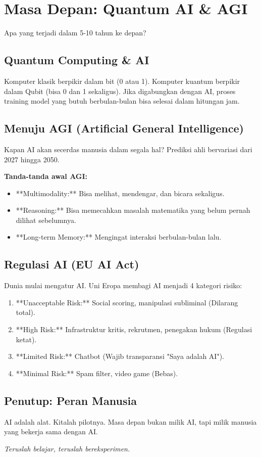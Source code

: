 \chapter{Masa Depan: Quantum AI \& AGI}
\label{chap:future}

Apa yang terjadi dalam 5-10 tahun ke depan?

\section{Quantum Computing \& AI}

Komputer klasik berpikir dalam bit (0 atau 1). Komputer kuantum berpikir dalam Qubit (bisa 0 dan 1 sekaligus).
Jika digabungkan dengan AI, proses training model yang butuh berbulan-bulan bisa selesai dalam hitungan jam.

\section{Menuju AGI (Artificial General Intelligence)}

Kapan AI akan secerdas manusia dalam segala hal?
Prediksi ahli bervariasi dari 2027 hingga 2050.

\textbf{Tanda-tanda awal AGI:}
\begin{itemize}
    \item **Multimodality:** Bisa melihat, mendengar, dan bicara sekaligus.
    \item **Reasoning:** Bisa memecahkan masalah matematika yang belum pernah dilihat sebelumnya.
    \item **Long-term Memory:** Mengingat interaksi berbulan-bulan lalu.
\end{itemize}

\section{Regulasi AI (EU AI Act)}

Dunia mulai mengatur AI. Uni Eropa membagi AI menjadi 4 kategori risiko:
\begin{enumerate}
    \item **Unacceptable Risk:** Social scoring, manipulasi subliminal (Dilarang total).
    \item **High Risk:** Infrastruktur kritis, rekrutmen, penegakan hukum (Regulasi ketat).
    \item **Limited Risk:** Chatbot (Wajib transparansi "Saya adalah AI").
    \item **Minimal Risk:** Spam filter, video game (Bebas).
\end{enumerate}

\section{Penutup: Peran Manusia}

AI adalah alat. Kitalah pilotnya. Masa depan bukan milik AI, tapi milik manusia yang bekerja sama dengan AI.

\begin{center}
    \textit{Teruslah belajar, teruslah bereksperimen.}
\end{center}
